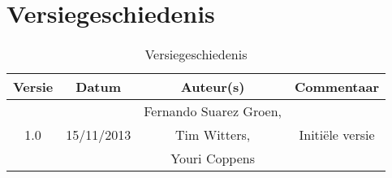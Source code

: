 \chapter{Versiegeschiedenis}

\begin{table}[htbp]
	\centering
	\begin{tabular} {|c|c|c|c|}
	    \hline
		\textbf{Versie} & \textbf{Datum} 	& \textbf{Auteur(s)} & \textbf{Commentaar} \\
		\hline
		\multirow{3}{*}{1.0 }   &  & Fernando Suarez Groen, &  \\
		                        & 15/11/2013  & Tim Witters,  & Initi\"{e}le versie\\
		                        &   & Youri Coppens & \\ \hline
	\end{tabular}
	\caption{Versiegeschiedenis}
\end{table}